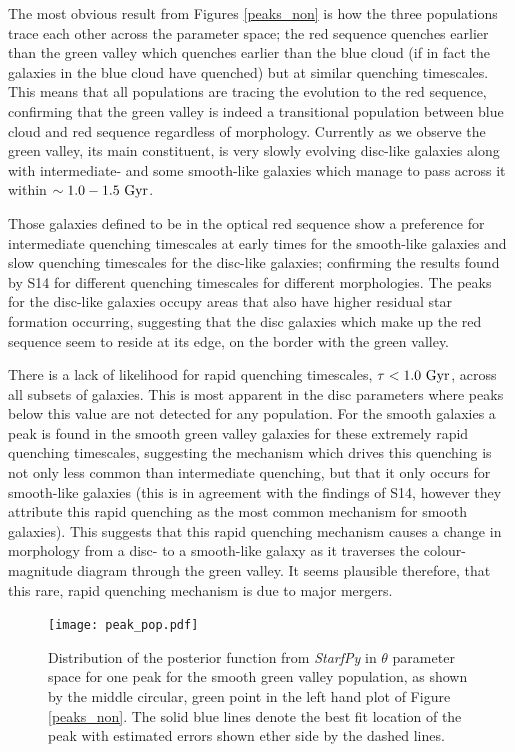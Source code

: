 \documentclass{mn2e}
\begin{document}
The most obvious result from Figures \ref{peaks_non} is how the three populations trace each other across the parameter space; the red sequence quenches earlier than the green valley which quenches earlier than the blue cloud (if in fact the galaxies in the blue cloud have quenched) but at similar quenching timescales. This means that all populations are tracing the evolution to the red sequence, confirming that the green valley is indeed a transitional population between blue cloud and red sequence regardless of morphology. Currently as we observe the green valley, its main constituent, is very slowly evolving disc-like galaxies along with intermediate- and some smooth-like galaxies which manage to pass across it within $\sim 1.0-1.5~\rm{Gyr}$.

Those galaxies defined to be in the optical red sequence show a preference for intermediate quenching timescales at early times for the smooth-like galaxies and slow quenching timescales for the disc-like galaxies; confirming the results found by S14 for different quenching timescales for different morphologies. The peaks for the disc-like galaxies occupy areas that also have higher residual star formation occurring, suggesting that the disc galaxies which make up the red sequence seem to reside at its edge, on the border with the green valley. 

There is a lack of likelihood for rapid quenching timescales, $\tau < 1.0~\rm{Gyr}$, across all subsets of galaxies. This is most apparent in the disc parameters %
where peaks below this value are not detected for any population. For the smooth galaxies a peak is found in the smooth green valley galaxies for these extremely rapid quenching timescales, suggesting the mechanism which drives this quenching is not only less common than intermediate quenching, but that it only occurs for smooth-like galaxies (this is in agreement with the findings of S14, however they attribute this rapid quenching as the most common mechanism for smooth galaxies). This suggests that this rapid quenching mechanism causes a change in morphology from a disc- to a smooth-like galaxy as it traverses the colour-magnitude diagram through the green valley. It seems plausible therefore, that this rare, rapid quenching mechanism is due to major mergers.

\begin{figure}
\texttt{[image: peak\_pop.pdf]}
\caption{Distribution of the posterior function from \emph{StarfPy} in $\theta$ parameter space for one peak for the smooth green valley population, as shown by the middle circular, green point in the left hand plot of Figure \ref{peaks_non}. The solid blue lines denote the best fit location of the peak with estimated errors shown ether side by the dashed lines.}
\label{peak_pop}
\end{figure}
\end{document}
